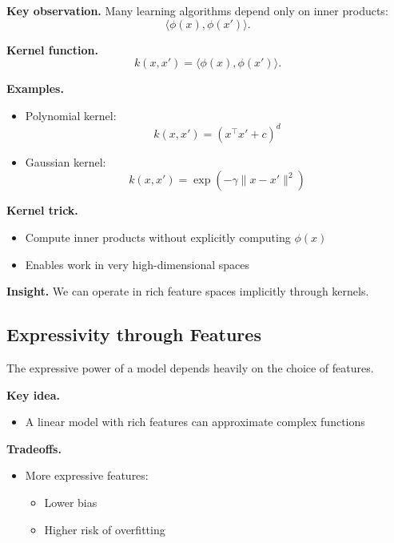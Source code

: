 \medskip

\noindent
\textbf{Key observation.}  
Many learning algorithms depend only on inner products:
\[
\langle \phi(x), \phi(x') \rangle.
\]

\medskip

\noindent
\textbf{Kernel function.}
\[
k(x, x') = \langle \phi(x), \phi(x') \rangle.
\]

\medskip

\noindent
\textbf{Examples.}
\begin{itemize}
    \item Polynomial kernel:
    \[
    k(x, x') = (x^\top x' + c)^d
    \]

    \item Gaussian kernel:
    \[
    k(x, x') = \exp(-\gamma \|x - x'\|^2)
    \]
\end{itemize}

\medskip

\noindent
\textbf{Kernel trick.}
\begin{itemize}
    \item Compute inner products without explicitly computing $\phi(x)$
    \item Enables work in very high-dimensional spaces
\end{itemize}

\medskip

\noindent
\textbf{Insight.}  
We can operate in rich feature spaces implicitly through kernels.

\subsection{Expressivity through Features}

The expressive power of a model depends heavily on the choice of features.

\medskip

\noindent
\textbf{Key idea.}
\begin{itemize}
    \item A linear model with rich features can approximate complex functions
\end{itemize}

\medskip

\noindent
\textbf{Tradeoffs.}
\begin{itemize}
    \item More expressive features:
    \begin{itemize}
        \item Lower bias
        \item Higher risk of overfitting
    \end{itemize}
\end{itemize}

